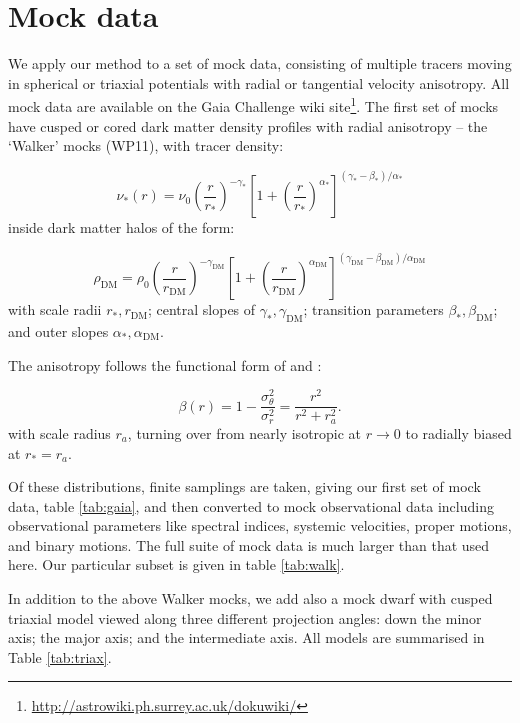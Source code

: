 \section{Mock data}\label{sec:mocks}

We apply our method to a set of mock data,
consisting of multiple tracers moving in spherical
or triaxial potentials with radial or tangential
velocity anisotropy. All mock data are available
on the {\sc Gaia Challenge} wiki
site\footnote{\href{http://astrowiki.ph.surrey.ac.uk/dokuwiki/}{http://astrowiki.ph.surrey.ac.uk/dokuwiki/}}. The
first set of mocks have cusped or cored dark
matter density profiles with radial anisotropy --
the `Walker' mocks (WP11), with tracer density:

\begin{equation}
    \nu_*(r) = \nu_0\left(\frac{r}{r_*}\right)^{-\gamma_*} \left[1+\left(\frac{r}{r_*}\right)^{\alpha_*}\right]^{(\gamma_*-\beta_*)/\alpha_*}
\end{equation}
inside dark matter halos of the form:

\begin{equation}
    \rho_{\text{DM}} = \rho_0\left(\frac{r}{r_{\text{DM}}}\right)^{-\gamma_{\text{DM}}}\left[1+\left(\frac{r}{r_{\text{DM}}}\right)^{\alpha_{\text{DM}}}\right]^{(\gamma_{\text{DM}}-\beta_{\text{DM}})/\alpha_{\text{DM}}}
\end{equation}
with scale radii $r_*, r_\text{DM}$; central
slopes of $\gamma_*, \gamma_{\text{DM}}$;
transition parameters $\beta_*,\beta_{\text{DM}}$;
and outer slopes $\alpha_*, \alpha_{\text{DM}}$.

The anisotropy follows the functional form of
\citet{Osipkov1979} and \citet{Merritt1985}:

\begin{equation}
    \beta(r)=1-\frac{\sigma_\theta^2}{\sigma_r^2} = \frac{r^2}{r^2+r_a^2}.
\end{equation}
with scale radius $r_a$, turning over from nearly
isotropic at $r\to 0$ to radially biased at
$r_*=r_a$.

Of these distributions, finite samplings are
taken, giving our first set of mock data, table
\ref{tab:gaia}, and then converted to mock
observational data including observational
parameters like spectral indices, systemic
velocities, proper motions, and binary
motions. The full suite of mock data is much
larger than that used here. Our particular subset
is given in table \ref{tab:walk}.

In addition to the above Walker mocks, we add also
a mock dwarf with cusped triaxial model viewed
along three different projection angles: down the
minor axis; the major axis; and the intermediate
axis. All models are summarised in Table
\ref{tab:triax}.

